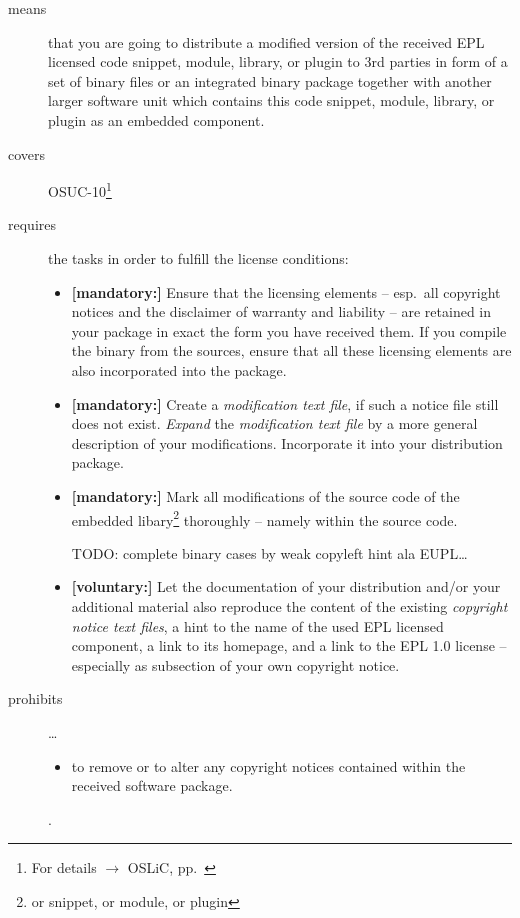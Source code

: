 \begin{description}
\item[means] that you are going to distribute a modified version of the received
EPL licensed code snippet, module, library, or plugin to 3rd parties in form
of a set of binary files or an integrated binary package together with another
larger software unit which contains this code snippet, module, library, or
plugin as an embedded component.
\item[covers] OSUC-10\footnote{For details $\rightarrow$ OSLiC, pp.\ \pageref{OSUC-10-DEF}}
\item[requires] the tasks in order to fulfill the license conditions:
\begin{itemize}

  \item \textbf{[mandatory:]} Ensure that the licensing elements -- esp.\ all
  copyright notices and the disclaimer of warranty and liability -- are retained
  in your package in exact the form you have received them. If you compile the
  binary from the sources, ensure that all these licensing elements are also
  incorporated into the package.
  
  \item \textbf{[mandatory:]} Create a \emph{modification text file}, if such a
  notice file still does not exist. \emph{Expand} the \emph{modification text
  file} by a more general description of your modifications. Incorporate it into
  your distribution package.

  \item \textbf{[mandatory:]} Mark all modifications of the source code of the
  embedded libary\footnote{or snippet, or module, or plugin} thoroughly --
  namely within the source code.  
  
  TODO: complete binary cases by weak copyleft hint ala EUPL\ldots
  

  \item \textbf{[voluntary:]} Let the documentation of your distribution and/or
  your additional material  also reproduce the content of the existing
  \emph{copyright notice text files}, a hint to the name of the used EPL
  licensed component, a link to its homepage, and a link to the EPL 1.0 license
  -- especially as subsection of your own copyright notice.
  
\end{itemize}

\item[prohibits] \ldots
\begin{itemize}
  \item to remove or to alter any copyright notices contained within the
  received software package.
\end{itemize}.

\end{description}


